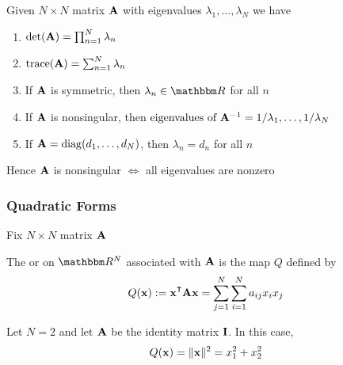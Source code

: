 \begin{frame}

     \vspace{2em}
    \Fact{\eqref{ET-fa:eiprop}} 
    Given $N \times N$ matrix $\mathbf A$ with eigenvalues $\lambda_1, \ldots, \lambda_N$
    we have
    \begin{enumerate}
            \vspace{-0.6em}
        \item $\det(\mathbf A) = \prod_{n=1}^N \lambda_n$
            \vspace{0.4em}
        \item $\operatorname{trace}(\mathbf A) = \sum_{n=1}^N \lambda_n$
            \vspace{0.4em}
        \item If $\mathbf A$ is symmetric, then $\lambda_n \in \RR$ for all $n$
            \vspace{0.4em}
        \item If $\mathbf A$ is nonsingular, then $\text{eigenvalues of } \mathbf A^{-1}
                = 1/\lambda_1, \ldots, 1/\lambda_N$
            \vspace{0.4em}
        \item If $\mathbf A = \operatorname{diag}(d_1, \ldots, d_N)$, then $\lambda_n = d_n$ for all $n$
    \end{enumerate}

    \vspace{0.8em}
    Hence $\mathbf A$ is nonsingular $\iff$ all eigenvalues are nonzero 
    
\end{frame}


\begin{frame}\frametitle{Quadratic Forms}

     \vspace{2em}
    Fix $N \times N$ matrix $\mathbf A$
    
    The  or  on $\RR^N$ associated with $\mathbf A$ is the
    map $Q$ defined by
    \begin{equation*}
        Q(\boldx) := \boldx^\T \boldA \boldx = \sum_{j=1}^N \sum_{i=1}^N a_{ij} x_i x_j
    \end{equation*}
    
    \vspace{.7em}
    \Eg Let $N = 2$ and let $\mathbf A$ be the identity
    matrix $\mathbf I$.  In this case, 
    \begin{equation*}
        Q({\mathbf x}) = \| {\mathbf x} \|^2 = x_1^2 + x_2^2
    \end{equation*}
    
\end{frame}

